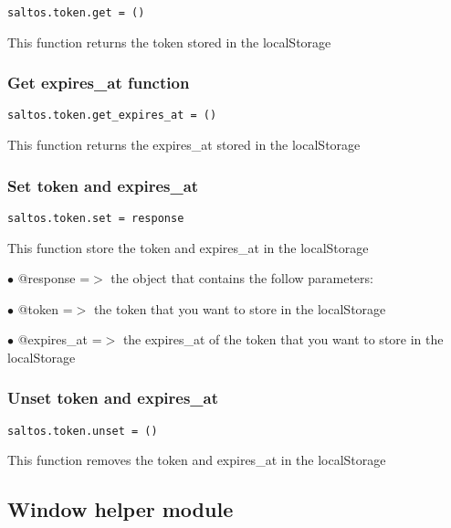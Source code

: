 \documentclass[a4paper]{article}
\begin{document}
\begin{lstlisting}
saltos.token.get = ()
\end{lstlisting}

This function returns the token stored in the localStorage

\hypertarget{toc858}{}
\subsubsection{Get expires\_at function}

\begin{lstlisting}
saltos.token.get_expires_at = ()
\end{lstlisting}

This function returns the expires\_at stored in the localStorage

\hypertarget{toc859}{}
\subsubsection{Set token and expires\_at}

\begin{lstlisting}
saltos.token.set = response
\end{lstlisting}

This function store the token and expires\_at in the localStorage

\begin{compactitem}
\item[\color{myblue}$\bullet$] @response   =$>$ the object that contains the follow parameters:
\item[\color{myblue}$\bullet$] @token      =$>$ the token that you want to store in the localStorage
\item[\color{myblue}$\bullet$] @expires\_at =$>$ the expires\_at of the token that you want to store in the localStorage
\end{compactitem}

\hypertarget{toc860}{}
\subsubsection{Unset token and expires\_at}

\begin{lstlisting}
saltos.token.unset = ()
\end{lstlisting}

This function removes the token and expires\_at in the localStorage

\hypertarget{toc861}{}
\subsection{Window helper module}
\end{document}
